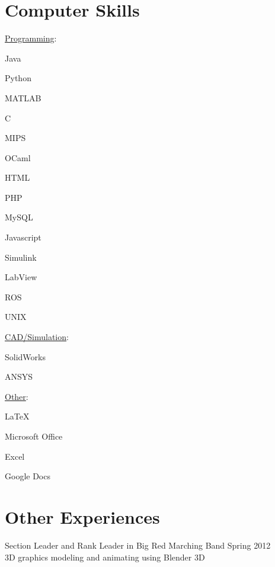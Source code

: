 \documentclass{BradyResume}
\begin{document}
\section*{Computer Skills}
\uline{Programming}:%
\begin{pipelist}
    \item Java
    \item Python
    \item MATLAB
    \item C
    \item MIPS
    \item OCaml
    \item HTML
    \item PHP
    \item MySQL
    \item Javascript
    \item Simulink 
    \item LabView
    \item ROS
    \item UNIX
\end{pipelist}
%
\uline{CAD/Simulation}:%
\begin{pipelist}
    \item SolidWorks
    \item ANSYS
\end{pipelist}
%
\uline{Other}:%
\begin{pipelist}
    \item \LaTeX
    \item Microsoft Office
    \item Excel
    \item Google Docs
\end{pipelist}

\section*{Other Experiences}
Section Leader and Rank Leader in Big Red Marching Band \hfill Spring 2012\\
3D graphics modeling and animating using Blender 3D
\end{document}
